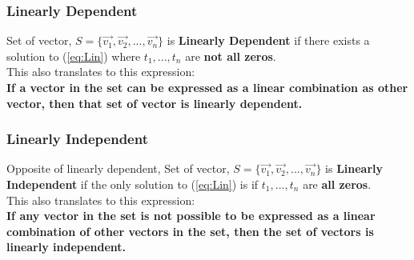 \documentclass[12pt]{article}
\begin{document}
\subsubsection{Linearly Dependent}
Set of vector, $S = \{\vec{v_1},\vec{v_2},...,\vec{v_n}\}$ is \textbf{Linearly Dependent} if there exists a solution to (\ref{eq:Lin}) where $t_1,...,t_n$ are \textbf{not all zeros}.\\
This also translates to this expression:\\
\textbf{If a vector in the set can be expressed as a linear combination as other vector, then that set of vector is linearly dependent.}\\

\subsubsection{Linearly Independent}
Opposite of linearly dependent, Set of vector, $S = \{\vec{v_1},\vec{v_2},...,\vec{v_n}\}$ is \textbf{Linearly Independent} if the only solution to (\ref{eq:Lin}) is if $t_1,...,t_n$ are \textbf{all zeros}.\\
This also translates to this expression:\\
\textbf{If any vector in the set is not possible to be expressed as a linear combination of other vectors in the set, then the set of vectors is linearly independent.}\\
\end{document}

